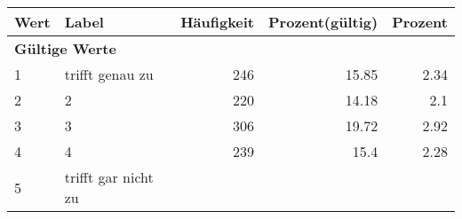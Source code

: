      \begin{longtable}{lXrrr}
     \toprule
     \textbf{Wert} & \textbf{Label} & \textbf{Häufigkeit} & \textbf{Prozent(gültig)} & \textbf{Prozent} \\
     \endhead
     \midrule
     \multicolumn{5}{l}{\textbf{Gültige Werte}}\\

     1 &
     \multicolumn{1}{X}{ trifft genau zu   } &


       \num{246} &
       \num[round-mode=places,round-precision=2]{15,85} &
         \num[round-mode=places,round-precision=2]{2,34} \\

     2 &
     \multicolumn{1}{X}{ 2   } &


       \num{220} &
       \num[round-mode=places,round-precision=2]{14,18} &
         \num[round-mode=places,round-precision=2]{2,1} \\

     3 &
     \multicolumn{1}{X}{ 3   } &


       \num{306} &
       \num[round-mode=places,round-precision=2]{19,72} &
         \num[round-mode=places,round-precision=2]{2,92} \\

     4 &
     \multicolumn{1}{X}{ 4   } &


       \num{239} &
       \num[round-mode=places,round-precision=2]{15,4} &
         \num[round-mode=places,round-precision=2]{2,28} \\

     5 &
     \multicolumn{1}{X}{ trifft gar nicht zu   } &



\end{longtable}
